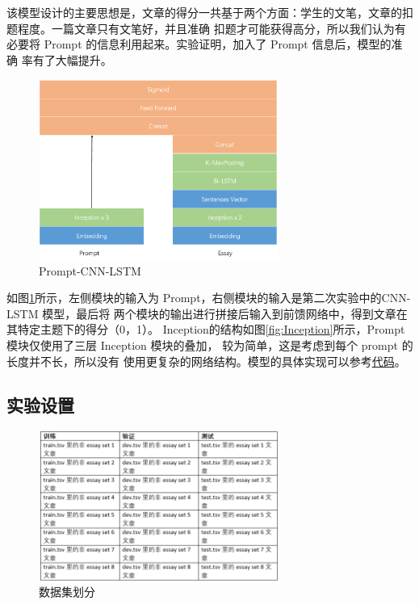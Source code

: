 \documentclass[UTF8]{article}
\begin{document}
该模型设计的主要思想是，文章的得分一共基于两个方面：学生的文笔，文章的扣题程度。一篇文章只有文笔好，并且准确
扣题才可能获得高分，所以我们认为有必要将 Prompt 的信息利用起来。实验证明，加入了 Prompt 信息后，模型的准确
率有了大幅提升。

\begin{figure}[h]
    \centering
    \includegraphics[width=0.7\textwidth]{fig/4.png}
    \caption{Prompt-CNN-LSTM}
    \label{fig:Prompt}
\end{figure}

如图\ref{fig:Prompt}所示，左侧模块的输入为 Prompt，右侧模块的输入是第二次实验中的CNN-LSTM 模型，最后将
两个模块的输出进行拼接后输入到前馈网络中，得到文章在其特定主题下的得分（0，1）。
Inception的结构如图\ref{fig:Inception}所示，Prompt 模块仅使用了三层 Inception 模块的叠加，
较为简单，这是考虑到每个 prompt 的长度并不长，所以没有
使用更复杂的网络结构。模型的具体实现可以参考\href{https://github.com/Mandule/EssayAE/tree/master/HW3}{代码}。

\subsection{实验设置}

\begin{figure}[h]
    \centering
    \includegraphics[width=0.7\textwidth]{fig/22.png}
    \caption{数据集划分}
    \label{fig:HW3}
\end{figure}
\end{document}
